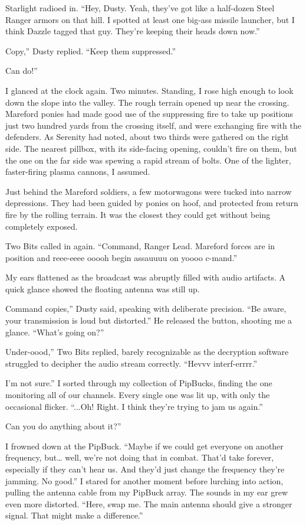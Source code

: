 Starlight radioed in. “Hey, Dusty. Yeah, they’ve got like a half-dozen Steel Ranger armors on that hill. I spotted at least one big-ass missile launcher, but I think Dazzle tagged that guy. They’re keeping their heads down now.”

\leavevmode{}Copy,” Dusty replied. “Keep them suppressed.”

\leavevmode{}Can do!”

I glanced at the clock again. Two minutes. Standing, I rose high enough to look down the slope into the valley. The rough terrain opened up near the crossing. Mareford ponies had made good use of the suppressing fire to take up positions just two hundred yards from the crossing itself, and were exchanging fire with the defenders. As Serenity had noted, about two thirds were gathered on the right side. The nearest pillbox, with its side-facing opening, couldn’t fire on them, but the one on the far side was spewing a rapid stream of bolts. One of the lighter, faster-firing plasma cannons, I assumed.

Just behind the Mareford soldiers, a few motorwagons were tucked into narrow depressions. They had been guided by ponies on hoof, and protected from return fire by the rolling terrain. It was the closest they could get without being completely exposed.

Two Bits called in again. “Command, Ranger Lead. Mareford forces are in position and reee-eeee ooooh begin assauuuu on yoooo c-mand.”

My ears flattened as the broadcast was abruptly filled with audio artifacts. A quick glance showed the floating antenna was still up.

\leavevmode{}Command copies,” Dusty said, speaking with deliberate precision. “Be aware, your transmission is loud but distorted.” He released the button, shooting me a glance. “What’s going on?”

\leavevmode{}Under-oood,” Two Bits replied, barely recognizable as the decryption software struggled to decipher the audio stream correctly. “Hevvv interf-errrr.”

\leavevmode{}I’m not sure.” I sorted through my collection of PipBucks, finding the one monitoring all of our channels. Every single one was lit up, with only the occasional flicker. “...Oh! Right. I think they’re trying to jam us again.”

\leavevmode{}Can you do anything about it?”

I frowned down at the PipBuck. “Maybe if we could get everyone on another frequency, but… well, we’re not doing that in combat. That’d take forever, especially if they can’t hear us. And they’d just change the frequency they’re jamming. No good.” I stared for another moment before lurching into action, pulling the antenna cable from my PipBuck array. The sounds in my ear grew even more distorted. “Here, swap me. The main antenna should give a stronger signal. That might make a difference.”

